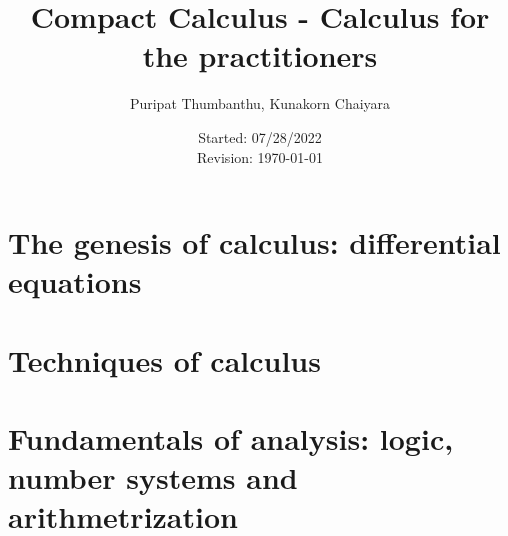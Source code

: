 \documentclass[b5paper,11pt,openleft]{memoir}
\begin{document}
\thispagestyle{empty}


\thispagestyle{empty}
\title{Compact Calculus - Calculus for the practitioners}
\author{Puripat Thumbanthu, Kunakorn Chaiyara}
\date{
  Started: 07/28/2022 \\
  Revision: \today
}
\maketitle

\frontmatter


\tableofcontents*



\mainmatter




\part{The genesis of calculus: differential equations}










\part{Techniques of calculus}







\part{Fundamentals of analysis: logic, number systems and arithmetrization}
\end{document}
